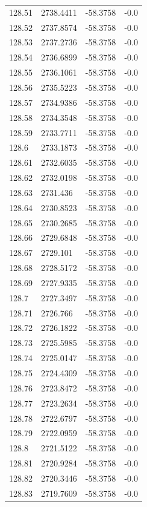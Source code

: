\begin{table}[H]
\begin{tabular}{llll}
128.51 & 2738.4411 & -58.3758 & -0.0 \\
128.52 & 2737.8574 & -58.3758 & -0.0 \\
128.53 & 2737.2736 & -58.3758 & -0.0 \\
128.54 & 2736.6899 & -58.3758 & -0.0 \\
128.55 & 2736.1061 & -58.3758 & -0.0 \\
128.56 & 2735.5223 & -58.3758 & -0.0 \\
128.57 & 2734.9386 & -58.3758 & -0.0 \\
128.58 & 2734.3548 & -58.3758 & -0.0 \\
128.59 & 2733.7711 & -58.3758 & -0.0 \\
128.6 & 2733.1873 & -58.3758 & -0.0 \\
128.61 & 2732.6035 & -58.3758 & -0.0 \\
128.62 & 2732.0198 & -58.3758 & -0.0 \\
128.63 & 2731.436 & -58.3758 & -0.0 \\
128.64 & 2730.8523 & -58.3758 & -0.0 \\
128.65 & 2730.2685 & -58.3758 & -0.0 \\
128.66 & 2729.6848 & -58.3758 & -0.0 \\
128.67 & 2729.101 & -58.3758 & -0.0 \\
128.68 & 2728.5172 & -58.3758 & -0.0 \\
128.69 & 2727.9335 & -58.3758 & -0.0 \\
128.7 & 2727.3497 & -58.3758 & -0.0 \\
128.71 & 2726.766 & -58.3758 & -0.0 \\
128.72 & 2726.1822 & -58.3758 & -0.0 \\
128.73 & 2725.5985 & -58.3758 & -0.0 \\
128.74 & 2725.0147 & -58.3758 & -0.0 \\
128.75 & 2724.4309 & -58.3758 & -0.0 \\
128.76 & 2723.8472 & -58.3758 & -0.0 \\
128.77 & 2723.2634 & -58.3758 & -0.0 \\
128.78 & 2722.6797 & -58.3758 & -0.0 \\
128.79 & 2722.0959 & -58.3758 & -0.0 \\
128.8 & 2721.5122 & -58.3758 & -0.0 \\
128.81 & 2720.9284 & -58.3758 & -0.0 \\
128.82 & 2720.3446 & -58.3758 & -0.0 \\
128.83 & 2719.7609 & -58.3758 & -0.0 \\

\end{tabular}
\end{table}
